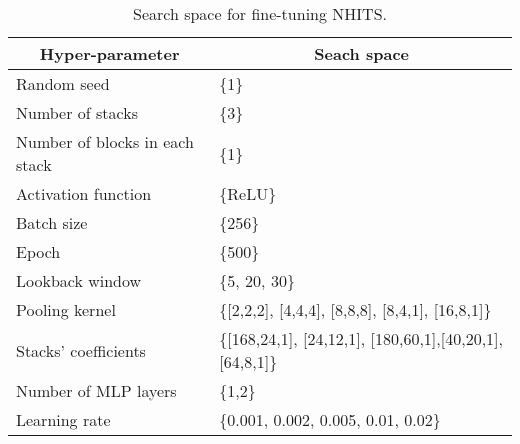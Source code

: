 
\begin{table}[H]
    \centering
    \caption{Search space for fine-tuning NHITS.}
    \label{tab:nhits_finetune}
    \begin{tabular}{ll} 
    \toprule
    \multicolumn{1}{c}{Hyper-parameter} & \multicolumn{1}{c}{Seach space}                              \\ 
    \hline
    Random seed                         & \{1\}                                                        \\
    Number of stacks                    & \{3\}                                                        \\
    Number of blocks in each stack      & \{1\}                                                        \\
    Activation function                 & \{ReLU\}                                                     \\
    Batch size                          & \{256\}                                                      \\
    Epoch                               & \{500\}                                                      \\ 
    \hline
    Lookback window                     & \{5, 20, 30\}                                                \\
    Pooling kernel                      & \{{[}2,2,2], [4,4,4], [8,8,8], [8,4,1], [16,8,1]\}           \\
    Stacks' coefficients                & \{{[}168,24,1], [24,12,1], [180,60,1],[40,20,1], [64,8,1]\}  \\
    Number of MLP layers                & \{1,2\}                                                      \\
    Learning rate                       & \{0.001, 0.002, 0.005, 0.01, 0.02\}                          \\
    \bottomrule
    \end{tabular}
\end{table}
